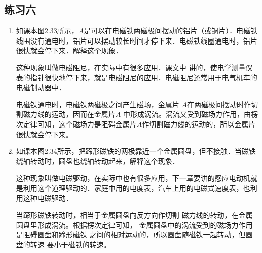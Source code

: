 \subsection{练习六}
\begin{enumerate}
    \item 如课本图2.33所示，$A$是可以在电磁铁两磁极间摆动的铝片（或铜片）．电磁铁线围没有通电时，铝片可以摆动较长时间才停下来．电磁铁线圈通电时，铝片很快就会停下来．解释这个现象．
    
这种现象叫做电磁阻尼，在实际中有很多应用．课文中
讲的，使电学测量仪表的指针很快地停下来，就是电磁阻尼的应用．电磁阻尼还常用于电气机车的电磁制动器中．

\begin{solution}
    电磁铁通电时，电磁铁两磁极之间产生磁场，金属片
    $A$在两磁极间摆动时作切割磁力线的运动，因而在金属片$A$
    中形成涡流。涡流又受到磁场力作用，由楞次定律可知，这个磁场力是阻碍金属片$A$作切割磁力线的运动的，所以金属片
    很快就会停下来。
\end{solution}


\item 如课本图2.34所示，把蹄形磁铁的两极靠近一个金属圆盘，但不接触．当磁铁绕轴转动时，圆盘也绕轴转动起来，解释这个现象．

这种现象叫做电磁驱动，在实际中也有很多应用，下一章要讲的感应电动机就是利用这个道理驱动的．家庭中用的电度表，汽车上用的电磁式速度表，也利用这种电磁驱动．

\begin{solution}
    当蹄形磁铁转动时，相当于金属圆盘向反方向作切割
    磁力线的转动，在金属圆盘里形成涡流。根据楞次定律可知，
    金属圆盘中的涡流受到的磁场力作用是阻碍圆盘和蹄形磁铁
    之间的相对运动的，所以圆盘随磁铁一起转动，但圆盘的转速
    要小于磁铁的转速。
\end{solution}

\end{enumerate}



